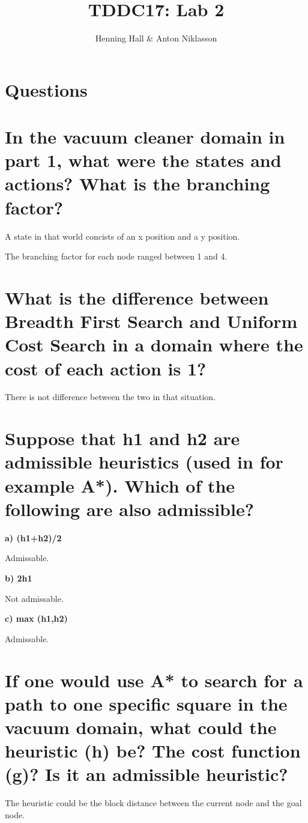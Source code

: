 \documentclass{article}
\begin{document}
\title{TDDC17: Lab 2}
\author{Henning Hall \& Anton Niklasson}
\maketitle


\section*{Questions}

\section{In the vacuum cleaner domain in part 1, what were the states and actions? What is the branching factor?}

A state in that world concists of an x position and a y position.

The branching factor for each node ranged between 1 and 4.

\section{What is the difference between Breadth First Search and Uniform Cost Search in a domain where the cost of each action is 1?}

There is not difference between the two in that situation.

\section{Suppose that h1 and h2 are admissible heuristics (used in for example A*). Which of the following are also admissible?}
\textbf{a) (h1+h2)/2}

Admissable.

\textbf{b) 2h1}

Not admissable.

\textbf{c) max (h1,h2)}

Admissable.

\section{If one would use A* to search for a path to one specific square in the vacuum domain, what could the heuristic (h) be? The cost function (g)? Is it an admissible heuristic?}

The heuristic could be the block distance between the current node and the goal node.
\end{document}
